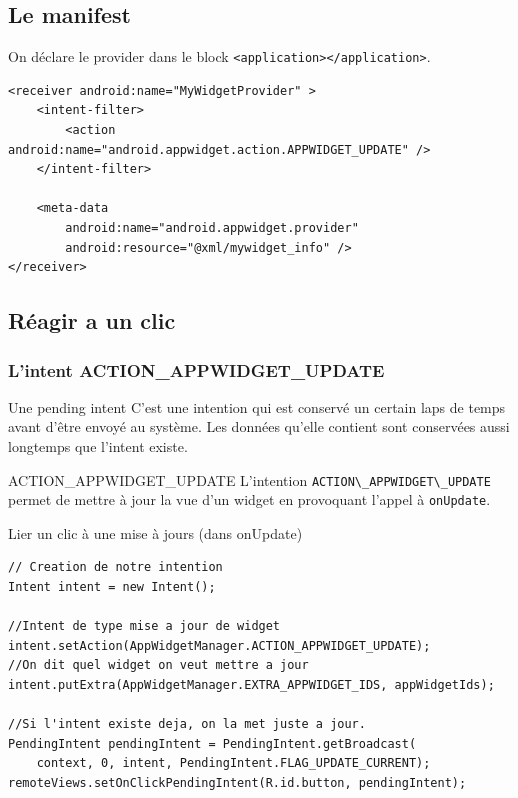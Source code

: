 \documentclass{beamer}
\begin{document}
\subsection{Le manifest}
\begin{frame}[fragile]
\begin{block}{On déclare le provider dans le block \verb!<application></application>!.}
\lstset{language=xml}
\begin{lstlisting}
<receiver android:name="MyWidgetProvider" >
    <intent-filter>
        <action android:name="android.appwidget.action.APPWIDGET_UPDATE" />
    </intent-filter>

    <meta-data
        android:name="android.appwidget.provider"
        android:resource="@xml/mywidget_info" />
</receiver>
\end{lstlisting}
\end{block}
\end{frame}

\subsection{Réagir a un clic}
\begin{frame}
\frametitle{L'intent ACTION\_APPWIDGET\_UPDATE}
\begin{block}{Une pending intent}
C'est une intention qui est conservé un certain laps de temps avant d’être envoyé au système. Les données qu'elle contient sont conservées aussi longtemps que l'intent existe.
\end{block}
\begin{block}{ACTION\_APPWIDGET\_UPDATE}
L'intention \verb!ACTION\_APPWIDGET\_UPDATE! permet de mettre à jour la vue d'un widget en provoquant l'appel à \verb!onUpdate!.
\end{block}
\end{frame}

\begin{frame}[fragile]
\lstset{language=java}
\begin{block}{Lier un clic à une mise à jours (dans onUpdate)}
\begin{lstlisting}
// Creation de notre intention
Intent intent = new Intent();

//Intent de type mise a jour de widget
intent.setAction(AppWidgetManager.ACTION_APPWIDGET_UPDATE);
//On dit quel widget on veut mettre a jour
intent.putExtra(AppWidgetManager.EXTRA_APPWIDGET_IDS, appWidgetIds);

//Si l'intent existe deja, on la met juste a jour.
PendingIntent pendingIntent = PendingIntent.getBroadcast(
    context, 0, intent, PendingIntent.FLAG_UPDATE_CURRENT);
remoteViews.setOnClickPendingIntent(R.id.button, pendingIntent);
\end{lstlisting}
\end{block}
\end{frame}
\end{document}
